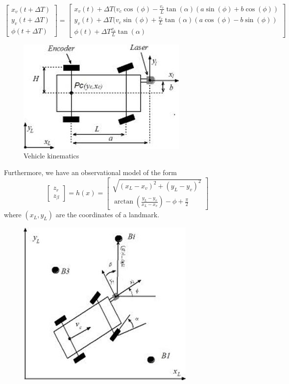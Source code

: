 \documentclass{article}
\begin{document}
\begin{enumerate}
\begin{equation}
\begin{bmatrix}
x_v(t+\Delta T)    \\
y_v(t+\Delta T)   \\
\phi(t+\Delta T)
\end{bmatrix}
=
\begin{bmatrix}
x_v(t) + \Delta T (v_c \cos(\phi) - \frac{v_c}{L} \tan(\alpha)(a \sin(\phi)+b \cos(\phi)) \\   
y_v(t) + \Delta T (v_c \sin(\phi) + \frac{v_c}{L} \tan(\alpha)(a \cos(\phi)- b \sin(\phi)) \\
\phi(t) + \Delta T \frac{v_c}{L} \tan(\alpha)
\end{bmatrix}
\end{equation}
\begin{figure}[H]
    \centering
    \includegraphics[width=0.6\linewidth]{image008.jpg}
    \caption{Vehicle kinematics}
    \label{fig:truck_kinematics_1}
\end{figure}
Furthermore, we have an observational model of the form
\begin{equation}
 \begin{bmatrix}
z_r \\ z_\beta  
\end{bmatrix}   
= h(x) = 
 \begin{bmatrix}
 \sqrt{ (x_L-x_v)^2 + (y_L-y_v)^2 } \\
 \arctan\left(\frac{y_L-y_v}{x_L-x_v}\right) - \phi + \frac{\pi}{2}
 \end{bmatrix} 
\end{equation}
where $(x_L,y_L)$ are the coordinates of a landmark.
\begin{figure}[H]
    \centering
    \includegraphics[width=0.5\linewidth]{image010.jpg}

\end{figure}
\end{enumerate}
\end{document}
